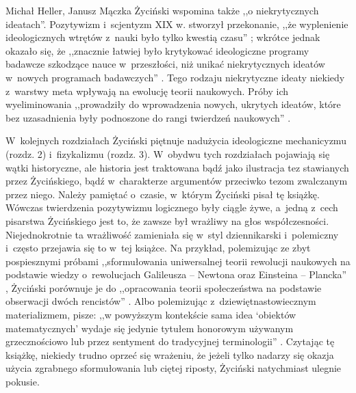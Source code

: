 \begin{newrevplenv2auth}{Michał Heller, Janusz Mączka}
Życiński wspomina także ,,o niekrytycznych ideatach''. Pozytywizm i~scjentyzm XIX w. stworzył przekonanie, ,,że wyplenienie ideologicznych wtrętów z~nauki było tylko kwestią czasu''
\parencite[][s.~49]{zycinski_struktura_2013}; %
 wkrótce jednak okazało się, że ,,znacznie łatwiej było krytykować ideologiczne programy badawcze szkodzące nauce w~przeszłości, niż unikać niekrytycznych ideatów w~nowych programach badawczych'' 
\parencite[][s.~49]{zycinski_struktura_2013}. %
 Tego rodzaju niekrytyczne ideaty niekiedy z~warstwy meta wpływają na ewolucję teorii naukowych. Próby ich wyeliminowania ,,prowadziły do wprowadzenia nowych, ukrytych ideatów, które bez uzasadnienia były podnoszone do rangi twierdzeń naukowych'' 
\parencite[][s.~59–60]{zycinski_struktura_2013}.%


W~kolejnych rozdziałach Życiński piętnuje nadużycia ideologiczne mechanicyzmu (rozdz. 2) i~fizykalizmu (rozdz. 3). W~obydwu tych rozdziałach pojawiają się wątki historyczne, ale historia jest traktowana bądź jako ilustracja tez stawianych przez Życińskiego, bądź w~charakterze argumentów przeciwko tezom zwalczanym przez niego. Należy pamiętać o~czasie, w~którym Życiński pisał tę książkę. Wówczas twierdzenia pozytywizmu logicznego były ciągle żywe, a~jedną z~cech pisarstwa Życińskiego jest to, że zawsze był wrażliwy na głos współczesności. Niejednokrotnie ta wrażliwość zamieniała się w~styl dziennikarski i~polemiczny i~często przejawia się to w~tej książce. Na przykład, polemizując ze zbyt pospiesznymi próbami ,,sformułowania uniwersalnej teorii rewolucji naukowych na podstawie wiedzy o~rewolucjach Galileusza -- Newtona oraz Einsteina -- Plancka''
\parencite[][s.~45]{zycinski_struktura_2013}, %
 Życiński porównuje je do ,,opracowania teorii społeczeństwa na podstawie obserwacji dwóch rencistów'' 
\parencite[][s.~45]{zycinski_struktura_2013}. %
 Albo polemizując z~dziewiętnastowiecznym materializmem, pisze: ,,w powyższym kontekście sama idea ‘obiektów matematycznych' wydaje się jedynie tytułem honorowym używanym grzecznościowo lub przez sentyment do tradycyjnej terminologii'' 
\parencite[][s.~138]{zycinski_struktura_2013}. %
 Czytając tę książkę, niekiedy trudno oprzeć się wrażeniu, że jeżeli tylko nadarzy się okazja użycia zgrabnego sformułowania lub ciętej riposty, Życiński natychmiast ulegnie pokusie.


\end{newrevplenv2auth}
